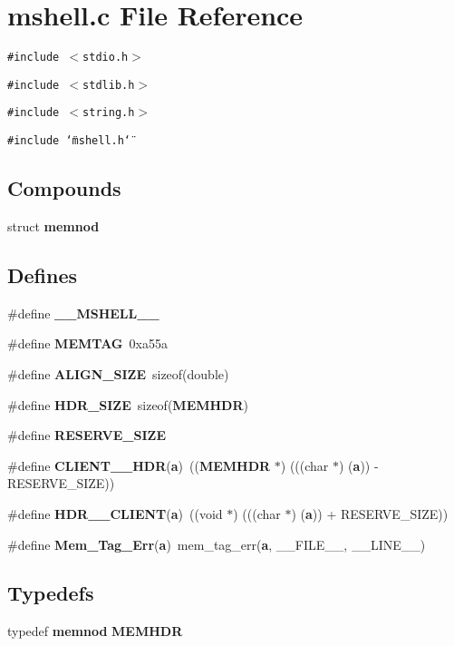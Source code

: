 \section{mshell.c File Reference}
\label{mshell_8c}
{\tt \#include $<$stdio.h$>$}\par
{\tt \#include $<$stdlib.h$>$}\par
{\tt \#include $<$string.h$>$}\par
{\tt \#include \char`\"{}mshell.h\char`\"{}}\par
\subsection*{Compounds}
\begin{CompactItemize}
\item 
struct {\bf memnod}
\end{CompactItemize}
\subsection*{Defines}
\begin{CompactItemize}
\item 
\#define {\bf \_\-\_\-MSHELL\_\-\_\-}
\item 
\#define {\bf MEMTAG}\ 0xa55a
\item 
\#define {\bf ALIGN\_\-SIZE}\ sizeof(double)
\item 
\#define {\bf HDR\_\-SIZE}\ sizeof({\bf MEMHDR})
\item 
\#define {\bf RESERVE\_\-SIZE}
\item 
\#define {\bf CLIENT\_\_\-HDR}({\bf a})\ (({\bf MEMHDR} $\ast$)  (((char $\ast$) ({\bf a})) - RESERVE\_\-SIZE))
\item 
\#define {\bf HDR\_\_\-CLIENT}({\bf a})\ ((void $\ast$)  (((char $\ast$) ({\bf a})) + RESERVE\_\-SIZE))
\item 
\#define {\bf Mem\_\-Tag\_\-Err}({\bf a})\ mem\_\-tag\_\-err({\bf a}, \_\-\_\-FILE\_\-\_\-, \_\-\_\-LINE\_\-\_\-)
\end{CompactItemize}
\subsection*{Typedefs}
\begin{CompactItemize}
\item 
typedef {\bf memnod} {\bf MEMHDR}
\end{CompactItemize}
